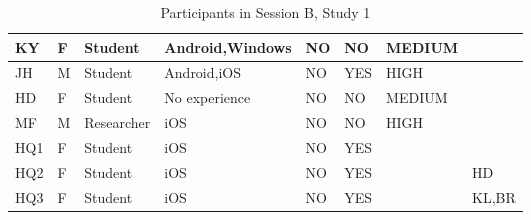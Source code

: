 \begin{table}[H]
{\begin{tabular}{|l|l|l|l|l|l|l|l|}
KY       & F      & Student    & Android,Windows                                                 & NO                                                                 & NO                                                                   & MEDIUM                                                       &                                                                    \\ \hline
JH       & M      & Student    & Android,iOS                                                     & NO                                                                 & YES                                                                  & HIGH                                                         &                                                                    \\ \hline
HD       & F      & Student    & No experience                                                   & NO                                                                 & NO                                                                   & MEDIUM                                                       &                                                                    \\ \hline
MF       & M      & Researcher & iOS                                                             & NO                                                                 & NO                                                                   & HIGH                                                         &                                                                    \\ \hline
HQ1      & F      & Student    & iOS                                                             & NO                                                                 & YES                                                                  &                                                              &                                                                    \\ \hline
HQ2      & F      & Student    & iOS                                                             & NO                                                                 & YES                                                                  &                                                              & HD                                                                 \\ \hline
HQ3      & F      & Student    & iOS                                                             & NO                                                                 & YES                                                                  &                                                              & KL,BR                                                              \\ \hline
\end{tabular}}
\caption{Participants in Session B, Study 1}
\end{table}



